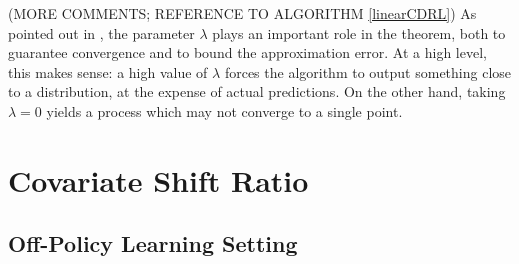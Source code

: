 \documentclass[12pt,a4paper,openright,twoside]{article}
\DeclareMathOperator*{\Sspace}{\mathcal{S}}
\DeclareMathOperator*{\T}{\mathcal{T}}
\numberwithin{equation}{section}
\theoremstyle{definition}
\theoremstyle{remark}
\theoremstyle{plain}
\begin{document}
(MORE COMMENTS; REFERENCE TO ALGORITHM \ref{linearCDRL})
As pointed out in \cite{DRLlinear}, the parameter $\lambda$ plays an important role in the theorem, both to guarantee convergence and to bound the approximation error. At a high level, this makes sense: a high value of $\lambda$ forces the algorithm to output something close to a distribution, at the expense of actual predictions. On the other hand, taking $\lambda=0$ yields a process which may not converge to a single point.
 

\newpage


\thispagestyle{plain}

\thispagestyle{plain}
\section{Covariate Shift Ratio}




\subsection{Off-Policy Learning Setting} \label{offpolicySetting}
\end{document}
